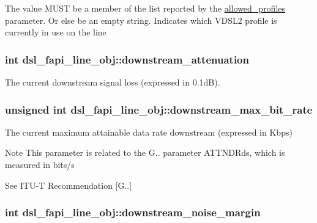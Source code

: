 The value M\-U\-S\-T be a member of the list reported by the \hyperlink{structdsl__fapi__line__obj_a59c5f2224ed0757a95e6ebde1d37e560}{allowed\-\_\-profiles} parameter. Or else be an empty string. Indicates which V\-D\-S\-L2 profile is currently in use on the line \hypertarget{structdsl__fapi__line__obj_a16af7c5196fe68ba1d39bcc6108a48d7}{
\subsubsection[{downstream\-\_\-attenuation}]{\setlength{\rightskip}{0pt plus 5cm}int dsl\-\_\-fapi\-\_\-line\-\_\-obj\-::downstream\-\_\-attenuation}}\label{structdsl__fapi__line__obj_a16af7c5196fe68ba1d39bcc6108a48d7}
The current downstream signal loss (expressed in 0.\-1d\-B). \hypertarget{structdsl__fapi__line__obj_a4e2dded4c31f6f40d1fa1a978e6ed1ec}{
\subsubsection[{downstream\-\_\-max\-\_\-bit\-\_\-rate}]{\setlength{\rightskip}{0pt plus 5cm}unsigned int dsl\-\_\-fapi\-\_\-line\-\_\-obj\-::downstream\-\_\-max\-\_\-bit\-\_\-rate}}\label{structdsl__fapi__line__obj_a4e2dded4c31f6f40d1fa1a978e6ed1ec}
The current maximum attainable data rate downstream (expressed in Kbps) \begin{DoxyNote}{Note}
This parameter is related to the G.. parameter A\-T\-T\-N\-D\-Rds, which is measured in bits/s 

See I\-T\-U-\/\-T Recommendation \mbox{[}G..\mbox{]} 
\end{DoxyNote}
\hypertarget{structdsl__fapi__line__obj_ac5cafce7d8f514b83612e26792e71ebb}{
\subsubsection[{downstream\-\_\-noise\-\_\-margin}]{\setlength{\rightskip}{0pt plus 5cm}int dsl\-\_\-fapi\-\_\-line\-\_\-obj\-::downstream\-\_\-noise\-\_\-margin}}\label{structdsl__fapi__line__obj_ac5cafce7d8f514b83612e26792e71ebb}
